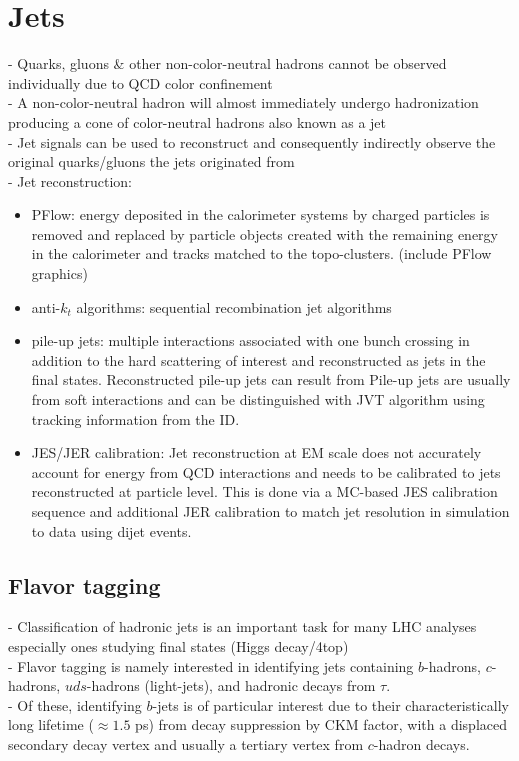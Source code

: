 \documentclass[../thesis.tex]{subfiles}
\begin{document}
\section{Jets}
- Quarks, gluons \& other non-color-neutral hadrons cannot be observed individually due to QCD color confinement\\
- A non-color-neutral hadron will almost immediately undergo hadronization producing a cone of color-neutral hadrons also known as a jet\\
- Jet signals can be used to reconstruct and consequently indirectly observe the original quarks/gluons the jets originated from\\
- Jet reconstruction:
\begin{itemize}
\item PFlow: energy deposited in the calorimeter systems by charged particles is removed and replaced by particle objects created with the remaining energy in the calorimeter and tracks matched to the topo-clusters. (include PFlow graphics)
\item anti-$k_t$ algorithms: sequential recombination jet algorithms
\item pile-up jets: multiple interactions associated with one bunch crossing in addition to the hard scattering of interest and reconstructed as jets in the final states. Reconstructed pile-up jets can result from   Pile-up jets are usually from soft interactions and can be distinguished with JVT algorithm using tracking information from the ID.
\item JES/JER calibration: Jet reconstruction at EM scale does not accurately account for energy from QCD interactions and needs to be calibrated to jets reconstructed at particle level. This is done via a MC-based JES calibration sequence and additional JER calibration to match jet resolution in simulation to data using dijet events.
\end{itemize}
\subsection{Flavor tagging}
\label{sec:ftag}
- Classification of hadronic jets is an important task for many LHC analyses especially ones studying final states (Higgs decay/4top)\\
- Flavor tagging is namely interested in identifying jets containing $b$-hadrons, $c$-hadrons, $uds$-hadrons (light-jets), and hadronic decays from $\tau$.\\
- Of these, identifying $b$-jets is of particular interest due to their characteristically long lifetime ($\approx 1.5$ ps) from decay suppression by CKM factor, with a displaced secondary decay vertex and usually a tertiary vertex from $c$-hadron decays.
\end{document}
